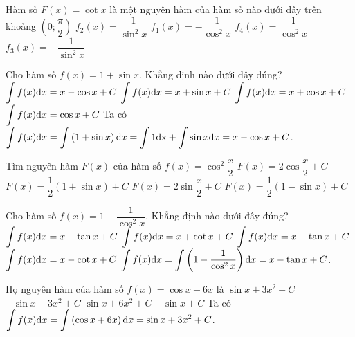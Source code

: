 \begin{ex}%
	Hàm số $F(x)=\cot x$ là một nguyên hàm của hàm số nào dưới đây trên khoảng $\left(0;\dfrac{\pi}{2}\right)$
	\choice
	{$f_2(x)=\dfrac{1}{\sin^2x}$}
	{$f_1(x)=-\dfrac{1}{\cos^2x}$}
	{$f_4(x)=\dfrac{1}{\cos^2x}$}
	{\True $f_3(x)=-\dfrac{1}{\sin^2x}$}
\end{ex}

\begin{ex}%
	Cho hàm số $f(x)=1+\sin x$. Khẳng định nào dưới đây đúng?
	\choice
	{\True $\displaystyle\int{f(x){\rm{d}}x}=x-\cos x+C$}
	{$\displaystyle\int{f(x){\rm{d}}x}=x+\sin x+C$}
	{$\displaystyle\int{f(x){\rm{d}}x}=x+\cos x+C$}
	{$\displaystyle\int{f(x){\rm{d}}x}=\cos x+C$}
	\loigiai
	{Ta có $\displaystyle\int{f(x){\rm{d}}x=\displaystyle\int{\left(1+\sin x\right){\rm{d}}x}=\displaystyle\int{1\rm{d}x}+\displaystyle\int{\sin x{\rm{d}}x}=x-\cos x+C}$.}
\end{ex}

\begin{ex}%
	Tìm nguyên hàm $F(x)$ của hàm số $f(x)=\cos ^2\dfrac{x}{2}$
	\choice
	{$F(x)=2\cos\dfrac{x}{2}+C$}
	{\True $F(x)=\dfrac{1}{2}\left(1+\sin x\right)+C$}
	{$F(x)=2\sin\dfrac{x}{2}+C$}
	{$F(x)=\dfrac{1}{2}\left(1-\sin x\right)+C$}
\end{ex}

\begin{ex}%
	Cho hàm số $f(x)=1-\dfrac{1}{\cos^2x}$. Khẳng định nào dưới đây đúng?
	\choice
	{$\displaystyle\int{f(x){\rm{d}}x}=x+\tan x+C$}
	{$\displaystyle\int{f(x){\rm{d}}x}=x+\cot x+C$}
	{\True $\displaystyle\int{f(x){\rm{d}}x}=x-\tan x+C$}
	{$\displaystyle\int{f(x){\rm{d}}x}=x-\cot x+C$}
	\loigiai
	{
		$\displaystyle\int{f(x){\rm{d}}x}=\displaystyle\int{\left(1-\dfrac{1}{\cos^2x}\right){\rm{d}}x}=x-\tan x+C$.}
\end{ex}

\begin{ex}%
	Họ nguyên hàm của hàm số $f(x)=\cos x+6x$ là
	\choice
	{\True $\sin x+3x^2+C$}
	{$-\sin x+3x^2+C$}
	{$\sin x+6x^2+C$}
	{$-\sin x+C$}
	\loigiai
	{
		Ta có $\displaystyle\int{f(x){\rm{d}}x=\displaystyle\int{\left(\cos x+6x\right){\rm{d}}x=\sin x+3x^2+C}}$.}
\end{ex}

